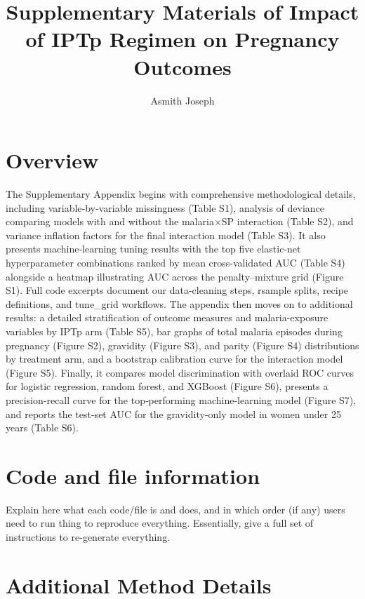 \documentclass[
  letterpaper,
  DIV=11,
  numbers=noendperiod]{scrartcl}
\title{Supplementary Materials of Impact of IPTp Regimen on Pregnancy
Outcomes}
\author{Asmith Joseph}
\date{}
\begin{document}
\maketitle


\newpage{}

\section{Overview}\label{overview}

The Supplementary Appendix begins with comprehensive methodological
details, including variable‐by‐variable missingness (Table S1), analysis
of deviance comparing models with and without the malaria×SP interaction
(Table S2), and variance inflation factors for the final interaction
model (Table S3). It also presents machine‐learning tuning results with
the top five elastic-net hyperparameter combinations ranked by mean
cross-validated AUC (Table S4) alongside a heatmap illustrating AUC
across the penalty--mixture grid (Figure S1). Full code excerpts
document our data-cleaning steps, rsample splits, recipe definitions,
and tune\_grid workflows. The appendix then moves on to additional
results: a detailed stratification of outcome measures and
malaria-exposure variables by IPTp arm (Table S5), bar graphs of total
malaria episodes during pregnancy (Figure S2), gravidity (Figure S3),
and parity (Figure S4) distributions by treatment arm, and a bootstrap
calibration curve for the interaction model (Figure S5). Finally, it
compares model discrimination with overlaid ROC curves for logistic
regression, random forest, and XGBoost (Figure S6), presents a
precision-recall curve for the top‐performing machine-learning model
(Figure S7), and reports the test-set AUC for the gravidity-only model
in women under 25 years (Table S6).

\section{Code and file information}\label{code-and-file-information}

Explain here what each code/file is and does, and in which order (if
any) users need to run thing to reproduce everything. Essentially, give
a full set of instructions to re-generate everything.

\newpage{}

\section{Additional Method Details}\label{additional-method-details}
\end{document}
